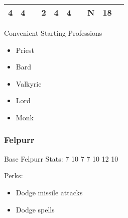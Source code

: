 \documentclass[12pt]{article}
\begin{document}
\begin{longtable}[]{@{}llllllllll@{}}
\begin{minipage}[t]{0.06\columnwidth}\raggedright\strut
4
\strut\end{minipage} &
\begin{minipage}[t]{0.06\columnwidth}\raggedright\strut
4
\strut\end{minipage} &
\begin{minipage}[t]{0.06\columnwidth}\raggedright\strut
\strut\end{minipage} &
\begin{minipage}[t]{0.06\columnwidth}\raggedright\strut
2
\strut\end{minipage} &
\begin{minipage}[t]{0.06\columnwidth}\raggedright\strut
4
\strut\end{minipage} &
\begin{minipage}[t]{0.06\columnwidth}\raggedright\strut
4
\strut\end{minipage} &
\begin{minipage}[t]{0.06\columnwidth}\raggedright\strut
\strut\end{minipage} &
\begin{minipage}[t]{0.07\columnwidth}\raggedright\strut
N
\strut\end{minipage} &
\begin{minipage}[t]{0.08\columnwidth}\raggedright\strut
18
\strut\end{minipage}\tabularnewline
\bottomrule
\end{longtable}

Convenient Starting Professions

\begin{itemize}
\item
  Priest
\item
  Bard
\item
  Valkyrie
\item
  Lord
\item
  Monk
\end{itemize}

\subsubsection{Felpurr}\label{felpurr}

Base Felpurr Stats: 7 10 7 7 10 12 10

Perks:

\begin{itemize}
\item
  Dodge missile attacks
\item
  Dodge spells
\end{itemize}
\end{document}
